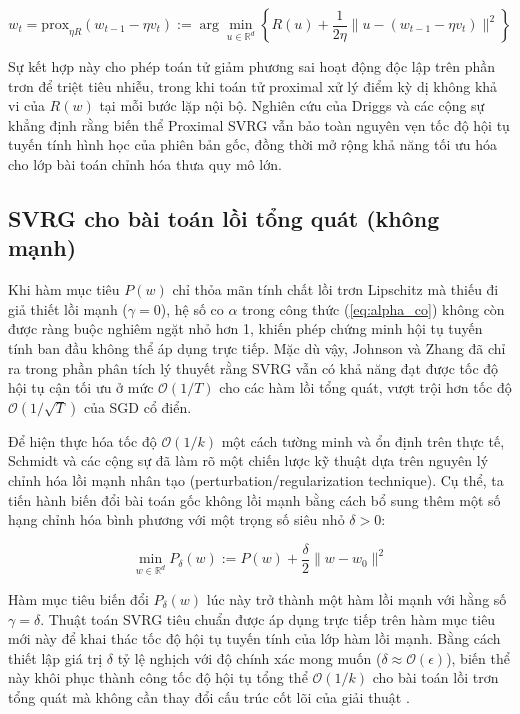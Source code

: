 \begin{equation}
w_t = \text{prox}_{\eta R} \left( w_{t-1} - \eta v_t \right) := \arg\min_{u \in \mathbb{R}^d} \left\{ R(u) + \frac{1}{2\eta} \|u - (w_{t-1} - \eta v_t)\|^2 \right\}
\end{equation}

Sự kết hợp này cho phép toán tử giảm phương sai hoạt động độc lập trên phần trơn để triệt tiêu nhiễu, trong khi toán tử proximal xử lý điểm kỳ dị không khả vi của $R(w)$ tại mỗi bước lặp nội bộ. Nghiên cứu của Driggs và các cộng sự \cite{driggs2022accelerating} khẳng định rằng biến thể Proximal SVRG vẫn bảo toàn nguyên vẹn tốc độ hội tụ tuyến tính hình học của phiên bản gốc, đồng thời mở rộng khả năng tối ưu hóa cho lớp bài toán chỉnh hóa thưa quy mô lớn.



\subsection{SVRG cho bài toán lồi tổng quát (không mạnh)}



Khi hàm mục tiêu $P(w)$ chỉ thỏa mãn tính chất lồi trơn Lipschitz mà thiếu đi giả thiết lồi mạnh ($\gamma = 0$), hệ số co $\alpha$ trong công thức (\ref{eq:alpha_co}) không còn được ràng buộc nghiêm ngặt nhỏ hơn 1, khiến phép chứng minh hội tụ tuyến tính ban đầu không thể áp dụng trực tiếp. Mặc dù vậy, Johnson và Zhang \cite{johnson2013accelerating} đã chỉ ra trong phần phân tích lý thuyết rằng SVRG vẫn có khả năng đạt được tốc độ hội tụ cận tối ưu ở mức $\mathcal{O}(1/T)$ cho các hàm lồi tổng quát, vượt trội hơn tốc độ $\mathcal{O}(1/\sqrt{T})$ của SGD cổ điển.



Để hiện thực hóa tốc độ $\mathcal{O}(1/k)$ một cách tường minh và ổn định trên thực tế, Schmidt và các cộng sự \cite{schmidt2017minimizing} đã làm rõ một chiến lược kỹ thuật dựa trên nguyên lý chỉnh hóa lồi mạnh nhân tạo (perturbation/regularization technique). Cụ thể, ta tiến hành biến đổi bài toán gốc không lồi mạnh bằng cách bổ sung thêm một số hạng chỉnh hóa bình phương với một trọng số siêu nhỏ $\delta > 0$:

\begin{equation}
\min_{w \in \mathbb{R}^d} P_\delta(w) := P(w) + \frac{\delta}{2} \|w - w_0\|^2
\end{equation}

Hàm mục tiêu biến đổi $P_\delta(w)$ lúc này trở thành một hàm lồi mạnh với hằng số $\gamma = \delta$. Thuật toán SVRG tiêu chuẩn được áp dụng trực tiếp trên hàm mục tiêu mới này để khai thác tốc độ hội tụ tuyến tính của lớp hàm lồi mạnh. Bằng cách thiết lập giá trị $\delta$ tỷ lệ nghịch với độ chính xác mong muốn ($\delta \approx \mathcal{O}(\epsilon)$), biến thể này khôi phục thành công tốc độ hội tụ tổng thể $\mathcal{O}(1/k)$ cho bài toán lồi trơn tổng quát mà không cần thay đổi cấu trúc cốt lõi của giải thuật \cite{schmidt2017minimizing}.


